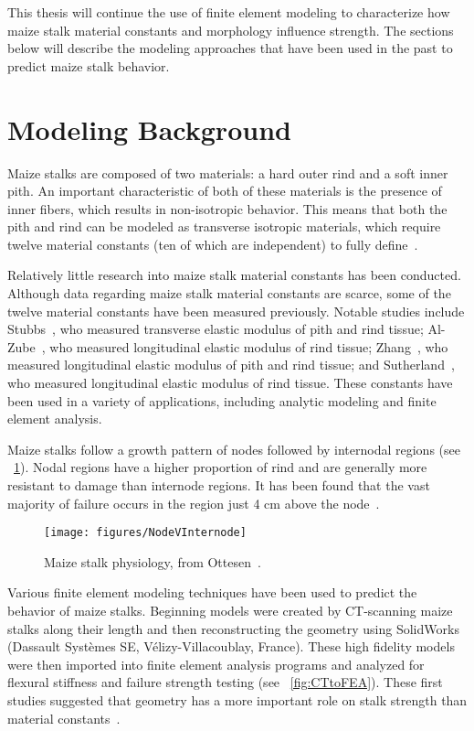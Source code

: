 This thesis will continue the use of finite element modeling to characterize how maize stalk material constants and morphology influence strength. The sections below will describe the modeling approaches that have been used in the past to predict maize stalk behavior. 


\section{Modeling Background}
\label{sec:modeling_background}
Maize stalks are composed of two materials: a hard outer rind and a soft inner pith. An important characteristic of both of these materials is the presence of inner fibers, which results in non-isotropic behavior. This means that both the pith and rind can be modeled as transverse isotropic materials, which require twelve material constants (ten of which are independent) to fully define~.

Relatively little research into maize stalk material constants has been conducted. Although data regarding maize stalk material constants are scarce, some of the twelve material constants have been measured previously. Notable studies include Stubbs~, who measured transverse elastic modulus of pith and rind tissue; Al-Zube~, who measured longitudinal elastic modulus of rind tissue; Zhang~, who measured longitudinal elastic modulus of pith and rind tissue; and Sutherland~, who measured longitudinal elastic modulus of rind tissue. These constants have been used in a variety of applications, including analytic modeling and finite element analysis.

Maize stalks follow a growth pattern of nodes followed by internodal regions (see ~\cref{fig:NodeVInternode}). Nodal regions have a higher proportion of rind and are generally more resistant to damage than internode regions. It has been found that the vast majority of failure occurs in the region just 4 cm above the node~.

\begin{figure}[htbp]
	\centering
	\texttt{[image: figures/NodeVInternode]}
	\caption[Maize stalk physiology.]{Maize stalk physiology, from Ottesen~\protect\cite{ottesen_parameterised_2022}.}
	\label{fig:NodeVInternode}
\end{figure}

Various finite element modeling techniques have been used to predict the behavior of maize stalks. Beginning models were created by CT-scanning maize stalks along their length and then reconstructing the geometry using SolidWorks (Dassault Systèmes SE, Vélizy-Villacoublay, France). These high fidelity models were then imported into finite element analysis programs and analyzed for flexural stiffness and failure strength testing (see ~\cref{fig:CTtoFEA}). These first studies suggested that geometry has a more important role on stalk strength than material constants~. 

